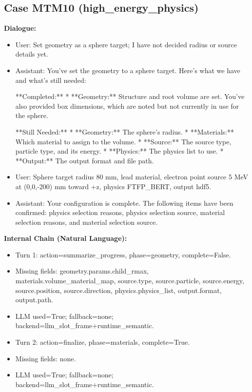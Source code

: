 \documentclass[11pt]{ctexart}
\begin{document}
\subsection{Case MTM10 (high\_energy\_physics)}
\textbf{Dialogue:}
\begin{itemize}
\item User: Set geometry as a sphere target; I have not decided radius or source details yet.
\item Assistant: You've set the geometry to a sphere target. Here's what we have and what's still needed:

**Completed:**
*   **Geometry:** Structure and root volume are set. You've also provided box dimensions, which are noted but not currently in use for the sphere.

**Still Needed:**
*   **Geometry:** The sphere's radius.
*   **Materials:** Which material to assign to the volume.
*   **Source:** The source type, particle type, and its energy.
*   **Physics:** The physics list to use.
*   **Output:** The output format and file path.
\item User: Sphere target radius 80 mm, lead material, electron point source 5 MeV at (0,0,-200) mm toward +z, physics FTFP\_BERT, output hdf5.
\item Assistant: Your configuration is complete. The following items have been confirmed: physics selection reasons, physics selection source, material selection reasons, and material selection source.
\end{itemize}
\textbf{Internal Chain (Natural Language):}
\begin{itemize}
\item Turn 1: action=summarize\_progress, phase=geometry, complete=False.
\item Missing fields: geometry.params.child\_rmax, materials.volume\_material\_map, source.type, source.particle, source.energy, source.position, source.direction, physics.physics\_list, output.format, output.path.
\item LLM used=True; fallback=none; backend=llm\_slot\_frame+runtime\_semantic.
\item Turn 2: action=finalize, phase=materials, complete=True.
\item Missing fields: none.
\item LLM used=True; fallback=none; backend=llm\_slot\_frame+runtime\_semantic.
\end{itemize}
\end{document}
